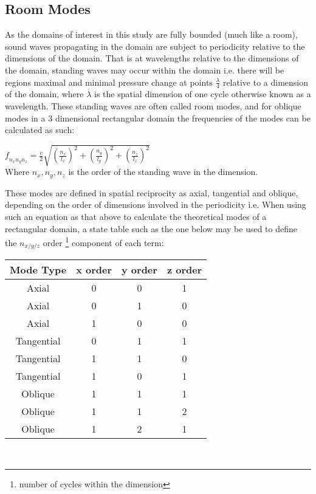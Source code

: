 \subsection{Room Modes}
As the domains of interest in this study are fully bounded (much like a room), sound waves propagating in the domain are subject to periodicity relative to the dimensions of the domain. That is at wavelengths relative to the dimensions of the domain, standing waves may occur within the domain i.e. there will be regions maximal and minimal pressure change at points $\frac{\lambda}{4}$ relative to a dimension of the domain, where $\lambda$ is the spatial dimension of one cycle otherwise known as a wavelength. These standing waves are often called room modes, and for oblique modes in a 3 dimensional rectangular domain the frequencies of the  modes can be calculated as such:\\
\begin{center}
$\textit{f}_{n_xn_yn_z} = \frac{c}{2} \sqrt{\left(\frac{n_x}{l_x}\right)^2 + \left(\frac{n_y}{l_y}\right)^2 + \left(\frac{n_z}{l_z}\right)^2} $\\
Where $n_x, n_y, n_z$ is the order of the standing wave in the dimension.\\
\end{center} 

These modes are defined in spatial reciprocity as axial, tangential and oblique, depending on the order of dimensions involved in the periodicity i.e. When using such an equation as that above to calculate the theoretical modes of a rectangular domain, a state table such as the one below may be used to define the $n_{x/y/z}$ order \footnote{number of cycles within the dimension} component of each term:\\

\begin{center}
\begin{tabular}{|c|c|c|c|} 
  \hline
 Mode Type & x order & y order & z order \\
 \hline
 Axial & 0 & 0 & 1 \\ 
 Axial & 0 & 1 & 0 \\  
 Axial & 1 & 0 & 0 \\
 Tangential & 0 & 1 & 1 \\ 
 Tangential & 1 & 1 & 0 \\  
 Tangential & 1 & 0 & 1 \\
 Oblique & 1 & 1 & 1 \\ 
 Oblique & 1 & 1 & 2 \\  
 Oblique & 1 & 2 & 1 \\        
 \hline
\end{tabular}\\
\end{center}

